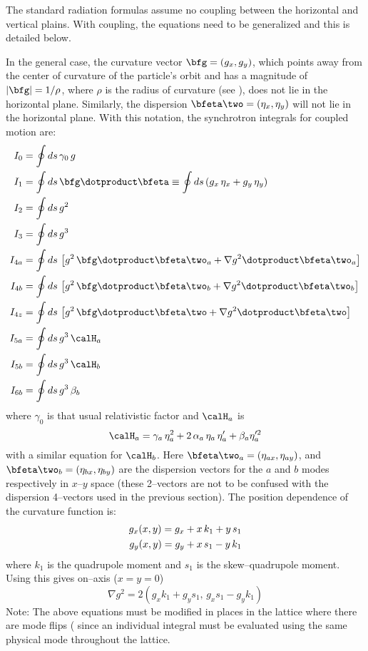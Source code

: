 The standard radiation formulas assume no coupling between the horizontal and vertical
plains\cite{b:helm,b:jowett}. With coupling, the equations need to be generalized and this is
detailed below.

In the general case, the curvature vector $\bfg = (g_x, g_y)$, which points away from the center of
curvature of the particle's orbit and has a magnitude of $|\bfg| = 1/\rho$, where $\rho$ is the
radius of curvature (see ), does not lie in the horizontal plane. Similarly, the
dispersion $\bfeta\two = (\eta_x, \eta_y)$ will not lie in the horizontal plane. With this notation,
the synchrotron integrals for coupled motion are:
  \begingroup
  \allowdisplaybreaks
  \begin{align}
    I_0 &= \oint ds \, \gamma_0 \, g \\
    I_1 &= \oint ds \, \bfg \dotproduct \bfeta 
         \equiv \oint ds \, (g_x \, \eta_x + g_y \, \eta_y) \\
    I_2 &= \oint ds \, g^2 \\
    I_3 &= \oint ds \, g^3 \\
    I_{4a} &= \oint ds \, \left[ g^2 \, \bfg \dotproduct \bfeta\two_a + 
         \nabla g^2 \dotproduct \bfeta\two_a \right] \\
    I_{4b} &= \oint ds \, \left[ g^2 \, \bfg \dotproduct \bfeta\two_b + 
         \nabla g^2 \dotproduct \bfeta\two_b \right] \\
    I_{4z} &= \oint ds \, \left[ g^2 \, \bfg \dotproduct \bfeta\two + 
         \nabla g^2 \dotproduct \bfeta\two \right] \\
    I_{5a} &= \oint ds \, g^3 \, \calH_a \\
    I_{5b} &= \oint ds \, g^3 \, \calH_b \\
    I_{6b} &= \oint ds \, g^3 \, \beta_b
  \end{align}
  \endgroup
where $\gamma_0$ is that usual relativistic factor and $\calH_a$ is 
  \begin{equation}
    \calH_a = \gamma_a \, \eta_a^2 + 2 \, \alpha_a \, \eta_a \, \eta_a' + 
      \beta_a \eta_a'^2 
  \end{equation}
with a similar equation for $\calH_b$. Here $\bfeta\two_a =
(\eta_{ax}, \eta_{ay})$, and $\bfeta\two_b = (\eta_{bx}, \eta_{by})$
are the dispersion vectors for the $a$ and $b$ modes respectively in
$x$--$y$ space (these 2--vectors are not to be confused with the
dispersion 4--vectors used in the previous section). The position
dependence of the curvature function is:
  \begin{align}
    g_x(x,y) = g_{x} + x \, k_1 + y \, s_1 \nonumber \\
    g_y(x,y) = g_{y} + x \, s_1 - y \, k_1 
  \end{align}
where $k_1$ is the quadrupole moment and $s_1$ is the skew--quadrupole moment.
Using this gives on--axis ($x = y = 0$)
  \begin{equation}
    \nabla g^2 = 2 \left( g_x k_1 + g_y s_1, \, g_x s_1 - g_y k_1 \right)
    \label{g2gkg}
  \end{equation}
Note: The above equations must be modified in places in the lattice where there are mode flips
( since an individual integral must be evaluated using the same physical mode
throughout the lattice.

